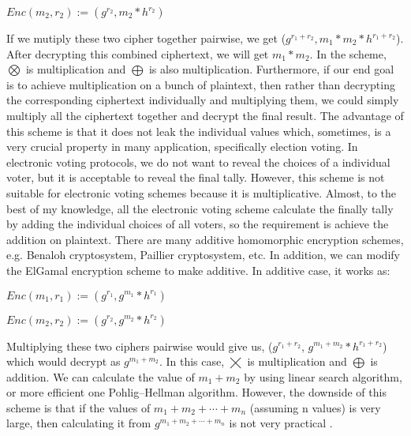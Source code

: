 \begin{enumerate}
	     \begin{displayquote}
	     $Enc(m_{2}, r_{2}) := (g^{r_{2}}, m_{2} *  h^{r_{2}})$ 
	      \end{displayquote}
	     
	     
	     If we mutiply these two cipher together pairwise, we get ($g^{r_{1}+ r_{2}}, m_{1} * m_{2} *  h^{r_{1} + r_{2}}$). 
	     After decrypting this combined ciphertext, we will get $m_{1} * m_{2}$. In the scheme, $\bigotimes$ is multiplication and 
	     $\bigoplus$ is also multiplication. Furthermore,  
	     if our end goal is  to achieve multiplication on a bunch of plaintext, then rather than decrypting the corresponding ciphertext individually 
	     and multiplying them, we could simply multiply all the ciphertext together and decrypt the final result.  
	     The advantage of this scheme is that it does not leak the individual values which, sometimes, is a very crucial property in many 
	     application, specifically election voting.
	     In electronic voting protocols, we do not want to reveal the choices of a individual voter, but it is acceptable to reveal the final tally. 
	     However, this scheme is not suitable for electronic voting schemes because it is multiplicative. Almost, to the best of 
	     my knowledge, all the electronic voting scheme calculate the finally tally by adding the individual choices of all
	     voters, so the requirement is achieve the addition on plaintext. 
	     There are 
	     many additive homomorphic encryption schemes, e.g. Benaloh cryptosystem, Paillier cryptosystem, etc. In addition, we 
	     can modify the ElGamal encryption scheme to make additive. In additive case, it works as:
	       \begin{displayquote}
	      $Enc(m_{1}, r_{1}) := (g^{r_{1}}, g^{m_{1}} *  h^{r_{1}})$ 
	      \end{displayquote}
	     
	     \begin{displayquote}
	    $Enc(m_{2}, r_{2}) := (g^{r_{2}}, g^{m_{2}} *  h^{r_{2}})$ 
	      \end{displayquote} 
	     
	    
	     
	    
	      \noindent
	      Multiplying these two ciphers pairwise would give us,  ($g^{r_{1} + r_{2}}$, $g^{m_{1} + m_{2}} * h^{r_{1} + r_{2}}$) which would decrypt as 
	      $g^{m_{1} + m_{2}}$. In this case, $\bigtimes$ is multiplication and $\bigoplus$ is addition.  We can calculate the value 
	      of $m_{1} + m_{2}$ by using linear search algorithm, or more efficient one 
	      Pohlig–Hellman algorithm. 
	      However, the downside 
	      of this scheme is that if the values of $m_{1} + m_{2} + \dotsb + m_{n}$ (assuming n values) is very large, then calculating it from 
	      $g^{m_{1} + m_{2} + \dotsb  + m_{n}}$ is 
	      not very practical \citep{10.1007/3-540-69053-0_9}. 
	     

\end{enumerate}
